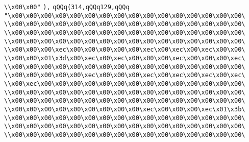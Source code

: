 \verb|\\x00\x00"|\newline
\verb|),|\newline
\verb|qQQq(314,qQQq129,qQQq|\newline
\verb|"\x00\x00\x00\x00\x00\x00\x00\x00\x00\x00\x00\x00\x00\x00\x00\x00\|\newline
\verb|\\x00\x00\x00\x00\x00\x00\x00\x00\x00\x00\x00\x00\x00\x00\x00\x00\|\newline
\verb|\\x00\x00\x00\x00\x00\x00\x00\x00\x00\x00\x00\x00\x00\x00\x00\x00\|\newline
\verb|\\x00\x00\x00\x00\x00\x00\x00\x00\x00\x00\x00\x00\x00\x00\x00\x00\|\newline
\verb|\\x00\x00\x00\xec\x00\x00\x00\x00\x00\xec\x00\xec\x00\xec\x00\x00\|\newline
\verb|\\x00\x00\x01\x3d\x00\xec\x00\xec\x00\x00\x00\xec\x00\x00\x00\xec\|\newline
\verb|\\x00\x00\x00\x00\x00\x00\x00\x00\x00\x00\x00\x00\x00\x00\x00\x00\|\newline
\verb|\\x00\x00\x00\x00\x00\xec\x00\x00\x00\xec\x00\xec\x00\xec\x00\xec\|\newline
\verb|\\x00\xec\x00\x00\x00\x00\x00\x00\x00\x00\x00\x00\x00\x00\x00\x00\|\newline
\verb|\\x00\x00\x00\x00\x00\x00\x00\x00\x00\x00\x00\x00\x00\x00\x00\x00\|\newline
\verb|\\x00\x00\x00\x00\x00\x00\x00\x00\x00\x00\x00\x00\x00\x00\x00\x00\|\newline
\verb|\\x00\x00\x00\x00\x00\x00\x00\x00\x00\xec\x00\x00\x00\xec\x01\x3b\|\newline
\verb|\\x00\x00\x00\x00\x00\x00\x00\x00\x00\x00\x00\x00\x00\x00\x00\x00\|\newline
\verb|\\x00\x00\x00\x00\x00\x00\x00\x00\x00\x00\x00\x00\x00\x00\x00\x00\|\newline
\verb|\\x00\x00\x00\x00\x00\x00\x00\x00\x00\x00\x00\x00\x00\x00\x00\x00\|\newline
